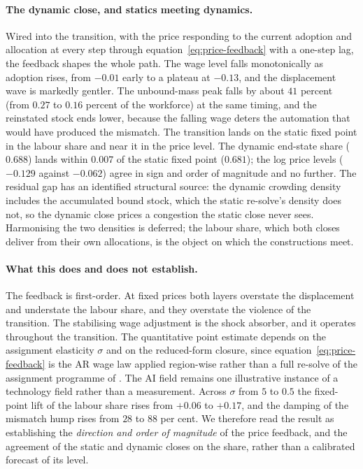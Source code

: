 \documentclass[12pt, a4paper]{article}
\begin{document}
\paragraph{The dynamic close, and statics meeting dynamics.}
Wired into the transition, with the price responding to the current
adoption and allocation at every step through
equation~\eqref{eq:price-feedback} with a one-step lag, the feedback
shapes the whole path. The wage level falls monotonically as adoption
rises, from $-0.01$ early to a plateau at $-0.13$, and the displacement
wave is markedly gentler. The unbound-mass peak falls by about $41$
percent (from $0.27$ to $0.16$ percent of the workforce) at the same
timing, and the reinstated stock ends lower, because the falling wage
deters the automation that would have produced the mismatch. The
transition lands on the static fixed point in the labour share and near
it in the price level. The dynamic end-state share ($0.688$) lands
within $0.007$ of the static fixed point ($0.681$); the log price
levels ($-0.129$ against $-0.062$) agree in sign and order of magnitude
and no further. The residual gap has an identified structural source:
the dynamic crowding density includes the accumulated bound stock,
which the static re-solve's density does not, so the dynamic close
prices a congestion the static close never sees. Harmonising the two
densities is deferred; the labour share, which both closes deliver from
their own allocations, is the object on which the constructions meet.

\paragraph{What this does and does not establish.}
The feedback is first-order. At fixed prices both layers overstate the
displacement and understate the labour share, and they overstate the
violence of the transition. The stabilising wage adjustment is the shock absorber, and it
operates throughout the transition. The quantitative point estimate depends on the assignment elasticity
$\sigma$ and on the reduced-form closure, since
equation~\eqref{eq:price-feedback} is the AR wage law applied
region-wise rather than a full re-solve of the assignment programme of
\textcite{storck2026fields}. The AI field remains one illustrative
instance of a technology field rather than a measurement. Across $\sigma$ from
$5$ to $0.5$ the fixed-point lift of the labour share rises from $+0.06$
to $+0.17$, and the damping of the mismatch
hump rises from $28$ to $88$ per cent. We therefore read the result
as establishing the \emph{direction and order of magnitude} of the price
feedback, and the agreement of the static and dynamic closes on the
share, rather
than a calibrated forecast of its level.
\end{document}
